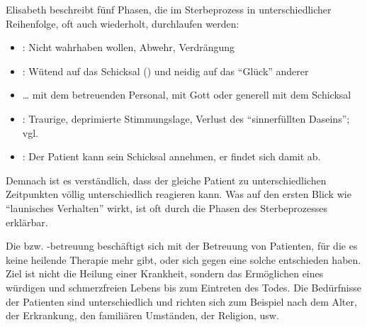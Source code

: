 







Elisabeth  beschreibt fünf Phasen, die im
Sterbeprozess in unterschiedlicher Reihenfolge, oft auch
wiederholt, durchlaufen werden:

\begin{itemize}
  \item {}: Nicht wahrhaben wollen, Abwehr,
  Verdrängung
  \item {}: Wütend auf das
  Schicksal () und neidig auf das \enquote{Glück} anderer
  \item {} {\ldots} mit dem
  betreuenden Personal, mit Gott oder generell mit dem
  Schicksal
  \item {}: Traurige,
  deprimierte Stimmungslage, Verlust des \enquote{sinnerfüllten
  Daseins}; vgl. 
  \item {}: Der Patient kann sein Schicksal
  annehmen, er findet sich damit ab.
\end{itemize}

Demnach ist es verständlich, dass der gleiche Patient zu
unterschiedlichen Zeitpunkten völlig unterschiedlich
reagieren kann. Was auf den ersten Blick wie \enquote{launisches
Verhalten} wirkt, ist oft durch die Phasen des
Sterbeprozesses erklärbar.


{Die  bzw. -betreuung beschäftigt
sich mit der Betreuung von Patienten, für die es keine heilende Therapie mehr
gibt, oder sich gegen eine solche entschieden haben.
Ziel ist nicht die Heilung einer Krankheit, sondern das
Ermöglichen eines würdigen und schmerzfreien Lebens bis zum Eintreten des Todes.
Die Bedürfnisse der Patienten sind unterschiedlich und richten
sich zum Beispiel nach dem Alter, der Erkrankung, den
familiären Umständen, der Religion, usw.}
{}
{}
{}
{}


